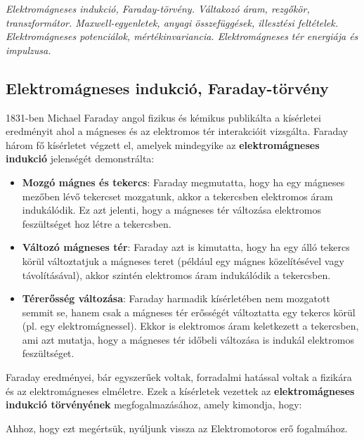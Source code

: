 \documentclass[../main.tex]{subfiles}
\begin{document}
\textit{Elektromágneses indukció, Faraday-törvény. Váltakozó áram, rezgőkör, transzformátor. Maxwell-egyenletek, anyagi összefüggések, illesztési feltételek.
Elektromágneses potenciálok, mértékinvariancia. Elektromágneses tér energiája és impulzusa.}

\subsection{Elektromágneses indukció, Faraday-törvény}

1831-ben Michael Faraday angol fizikus és kémikus publikálta a kísérletei eredményit ahol a mágneses és az elektromos tér interakcióit vizsgálta. Faraday három fő kísérletet végzett el, amelyek mindegyike az \textbf{elektromágneses indukció} jelenségét demonstrálta:
\begin{itemize}
    \item \textbf{Mozgó mágnes és tekercs}: Faraday megmutatta, hogy ha egy mágneses mezőben lévő tekercset mozgatunk, akkor a tekercsben elektromos áram indukálódik. Ez azt jelenti, hogy a mágneses tér változása elektromos feszültséget hoz létre a tekercsben.
    
    \item \textbf{Változó mágneses tér}: Faraday azt is kimutatta, hogy ha egy álló tekercs körül változtatjuk a mágneses teret (például egy mágnes közelítésével vagy távolításával), akkor szintén elektromos áram indukálódik a tekercsben.
    
    \item \textbf{Térerősség változása}: Faraday harmadik kísérletében nem mozgatott semmit se, hanem csak a mágneses tér erősségét változtatta egy tekercs körül (pl. egy elektromágnessel). Ekkor is elektromos áram keletkezett a tekercsben, ami azt mutatja, hogy a mágneses tér időbeli változása is indukál elektromos feszültséget.
\end{itemize}
Faraday eredményei, bár egyszerűek voltak, forradalmi hatással voltak a fizikára és az elektromágneses elméletre. Ezek a kísérletek vezettek az \textbf{elektromágneses indukció törvényének} megfogalmazásához, amely kimondja, hogy:
\begin{quote}
\end{quote}
Ahhoz, hogy ezt megértsük, nyúljunk vissza az Elektromotoros erő fogalmához.
\end{document}

